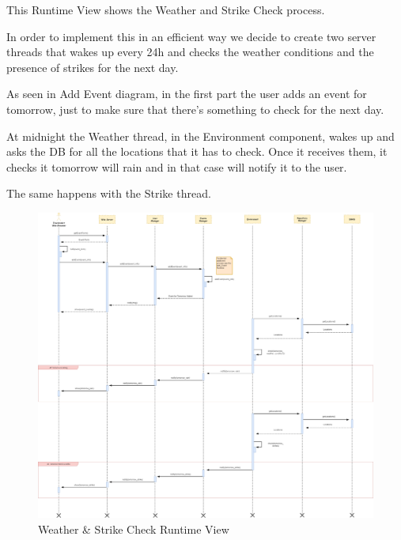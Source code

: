 This Runtime View shows the Weather and Strike Check process.\par
In order to implement this in an efficient way we decide to create two server threads that wakes up every 24h and checks the weather conditions and the presence of strikes for the next day.\par
As seen in Add Event diagram, in the first part the user adds an event for tomorrow, just to make sure that there’s something to check for the next day.\par
At midnight the Weather thread, in the Environment component, wakes up and asks the DB for all the locations that it has to check. Once it receives them, it checks it tomorrow will rain and in that case will notify it to the user.\par
The same happens with the Strike thread.
\begin{figure}[H]
	\centering
	\includegraphics[scale=0.165]{Images/Runtime/Weather_Strike_Check}
	\caption{Weather \& Strike Check Runtime View}
\end{figure}

